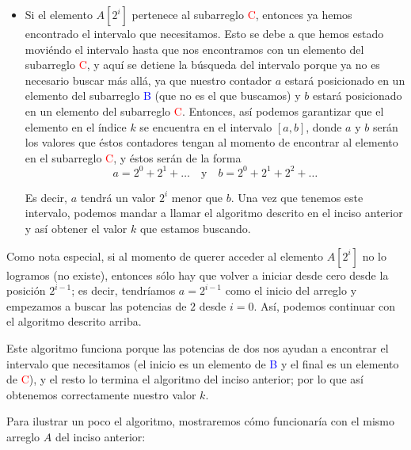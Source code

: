 \documentclass[letterpaper,11pt]{article}
\begin{document}
\begin{enumerate}
\begin{enumerate}
\begin{itemize}
            \item Si el elemento $A[2^i]$ pertenece al subarreglo 
            \textcolor{red}{C}, entonces ya hemos encontrado el intervalo que 
            necesitamos. Esto se debe a que hemos estado moviéndo el intervalo 
            hasta que nos encontramos con un elemento del subarreglo 
            \textcolor{red}{C}, y aquí se detiene la búsqueda del intervalo 
            porque ya no es necesario buscar más allá, ya que nuestro contador 
            $a$ estará posicionado en un elemento del subarreglo 
            \textcolor{blue}{B} (que no es el que buscamos) y $b$ estará 
            posicionado en un elemento del subarreglo \textcolor{red}{C}. 
            Entonces, así podemos garantizar que el elemento en el índice $k$
            se encuentra en el intervalo $[a, b]$, donde $a$ y $b$ serán los 
            valores que éstos contadores tengan al momento de encontrar al 
            elemento en el subarreglo \textcolor{red}{C}, y éstos serán de 
            la forma 
            \begin{equation*}
                a = 2^0 + 2^1 + \ldots 
                \quad \text{y} \quad 
                b = 2^0 + 2^1 + 2^2 + \dots
            \end{equation*}

            Es decir, $a$ tendrá un valor $2^i$ menor que $b$. Una vez que 
            tenemos este intervalo, podemos mandar a llamar el algoritmo 
            descrito en el inciso anterior y así obtener el valor $k$ que 
            estamos buscando.
        \end{itemize}

        Como nota especial, si al momento de querer acceder al elemento $A[2^i]$
        no lo logramos (no existe), entonces sólo hay que volver a iniciar desde 
        cero desde la posición $2^{i-1}$; es decir, tendríamos $a = 2^{i-1}$ 
        como el inicio del arreglo y empezamos a buscar las potencias de $2$
        desde $i = 0$. Así, podemos continuar con el algoritmo descrito arriba.

        Este algoritmo funciona porque las potencias de dos nos ayudan a 
        encontrar el intervalo que necesitamos (el inicio es un elemento de 
        \textcolor{blue}{B} y el final es un elemento de \textcolor{red}{C}), y 
        el resto lo termina el algoritmo del inciso anterior; por lo que así 
        obtenemos correctamente nuestro valor $k$. 

        Para ilustrar un poco el algoritmo, mostraremos cómo funcionaría con el 
        mismo arreglo $A$ del inciso anterior:
        \begin{figure}[h!]
        \centering
\end{figure}
\end{enumerate}
\end{enumerate}
\end{document}
